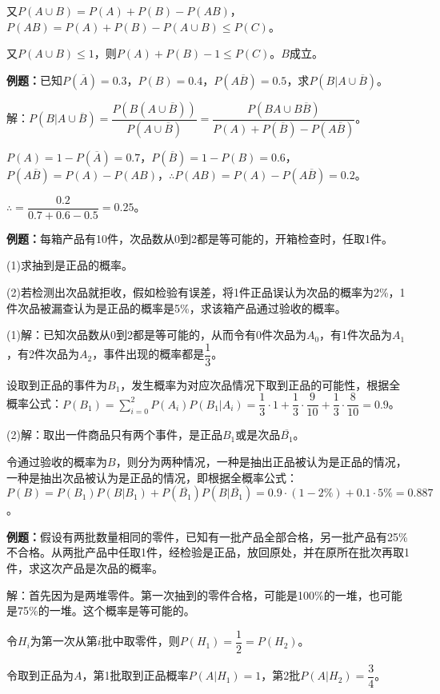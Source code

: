 \documentclass[UTF8, 12pt]{ctexart}
\begin{document}
又$P(A\cup B)=P(A)+P(B)-P(AB)$，$P(AB)=P(A)+P(B)-P(A\cup B)\leqslant P(C)$。

又$P(A\cup B)\leqslant1$，则$P(A)+P(B)-1\leqslant P(C)$。$B$成立。

\textbf{例题：}已知$P(\overline{A})=0.3$，$P(B)=0.4$，$P(A\overline{B})=0.5$，求$P(B|A\cup\overline{B})$。

解：$P(B|A\cup\overline{B})=\dfrac{P(B(A\cup\overline{B}))}{P(A\cup\overline{B})}=\dfrac{P(BA\cup B\overline{B})}{P(A)+P(\overline{B})-P(A\overline{B})}$。

$P(A)=1-P(\overline{A})=0.7$，$P(\overline{B})=1-P(B)=0.6$，$P(A\overline{B})=P(A)-P(AB)$，$\therefore P(AB)=P(A)-P(A\overline{B})=0.2$。

$\therefore =\dfrac{0.2}{0.7+0.6-0.5}=0.25$。\medskip

\textbf{例题：}每箱产品有10件，次品数从0到2都是等可能的，开箱检查时，任取1件。

(1)求抽到是正品的概率。

(2)若检测出次品就拒收，假如检验有误差，将1件正品误认为次品的概率为2\%，1件次品被漏查认为是正品的概率是5\%，求该箱产品通过验收的概率。

(1)解：已知次品数从0到2都是等可能的，从而令有0件次品为$A_0$，有1件次品为$A_1$，有2件次品为$A_2$，事件出现的概率都是$\dfrac{1}{3}$。

设取到正品的事件为$B_1$，发生概率为对应次品情况下取到正品的可能性，根据全概率公式：$P(B_1)=\sum\limits_{i=0}^2P(A_i)P(B_1|A_i)=\dfrac{1}{3}\cdot1+\dfrac{1}{3}\cdot\dfrac{9}{10}+\dfrac{1}{3}\cdot\dfrac{8}{10}=0.9$。

(2)解：取出一件商品只有两个事件，是正品$B_1$或是次品$\overline{B_1}$。

令通过验收的概率为$B$，则分为两种情况，一种是抽出正品被认为是正品的情况，一种是抽出次品被认为是正品的情况，即根据全概率公式：$P(B)=P(B_1)P(B|B_1)+P(\overline{B_1})P(B|\overline{B_1})=0.9\cdot(1-2\%)+0.1\cdot5\%=0.887$。

\textbf{例题：}假设有两批数量相同的零件，已知有一批产品全部合格，另一批产品有25\%不合格。从两批产品中任取1件，经检验是正品，放回原处，并在原所在批次再取1件，求这次产品是次品的概率。

解：首先因为是两堆零件。第一次抽到的零件合格，可能是100\%的一堆，也可能是75\%的一堆。这个概率是等可能的。

令$H_i$为第一次从第$i$批中取零件，则$P(H_1)=\dfrac{1}{2}=P(H_2)$。

令取到正品为$A$，第1批取到正品概率$P(A|H_1)=1$，第2批$P(A|H_2)=\dfrac{3}{4}$。
\end{document}
